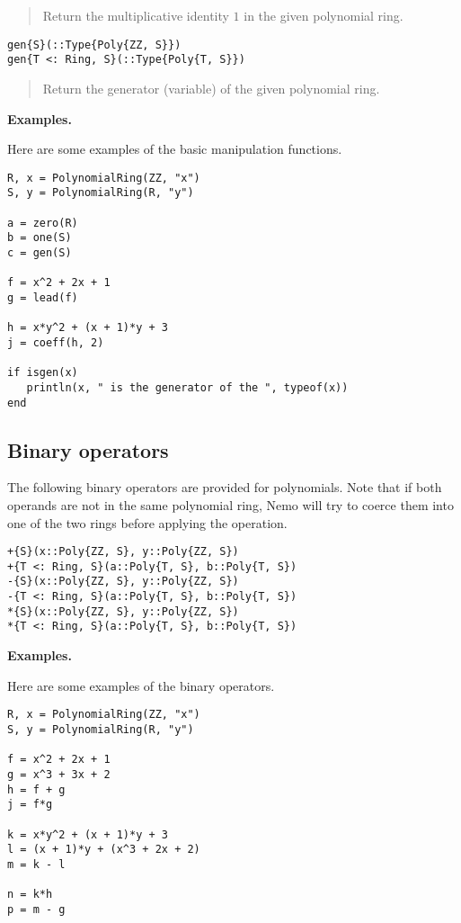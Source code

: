 \documentclass[a4paper,10pt]{article}
\newcommand{\desc}[1]{\vspace{-3mm}\begin{quote}#1\end{quote}}
\begin{document}
{{{\desc{Return the multiplicative identity $1$ in the given polynomial ring.}

\begin{lstlisting}
gen{S}(::Type{Poly{ZZ, S}})
gen{T <: Ring, S}(::Type{Poly{T, S}})
\end{lstlisting}

\desc{Return the generator (variable) of the given polynomial ring.}

\textbf{Examples.}

Here are some examples of the basic manipulation functions.

\begin{lstlisting}
R, x = PolynomialRing(ZZ, "x")
S, y = PolynomialRing(R, "y")

a = zero(R)
b = one(S)
c = gen(S)

f = x^2 + 2x + 1
g = lead(f)

h = x*y^2 + (x + 1)*y + 3
j = coeff(h, 2)

if isgen(x)
   println(x, " is the generator of the ", typeof(x))
end
\end{lstlisting}

\subsection{Binary operators}

The following binary operators are provided for polynomials. Note that
if both operands are not in the same polynomial ring, Nemo will try to
coerce them into one of the two rings before applying the operation.

\begin{lstlisting}
+{S}(x::Poly{ZZ, S}, y::Poly{ZZ, S})
+{T <: Ring, S}(a::Poly{T, S}, b::Poly{T, S})
-{S}(x::Poly{ZZ, S}, y::Poly{ZZ, S})
-{T <: Ring, S}(a::Poly{T, S}, b::Poly{T, S})
*{S}(x::Poly{ZZ, S}, y::Poly{ZZ, S})
*{T <: Ring, S}(a::Poly{T, S}, b::Poly{T, S})
\end{lstlisting}

\textbf{Examples.}

Here are some examples of the binary operators.

\begin{lstlisting}
R, x = PolynomialRing(ZZ, "x")
S, y = PolynomialRing(R, "y")

f = x^2 + 2x + 1
g = x^3 + 3x + 2
h = f + g
j = f*g

k = x*y^2 + (x + 1)*y + 3
l = (x + 1)*y + (x^3 + 2x + 2)
m = k - l

n = k*h
p = m - g
\end{lstlisting}

}}}
\end{document}
